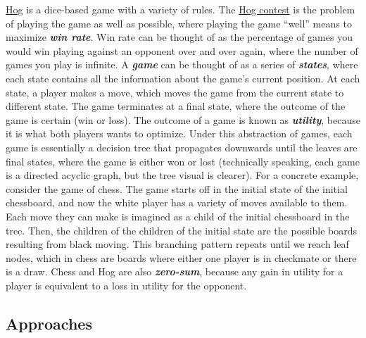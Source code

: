 \documentclass[11pt, oneside]{article}
\newcommand{\emphasis}[1]{\textbf{\textit{#1}}}
\begin{document}
\href{https://cs61a.org/proj/hog/}{Hog} is a dice-based game with a variety of rules.
The \href{https://cs61a.org/proj/hog_contest/}{Hog contest} is the problem
of playing the game as well as possible, where playing the game ``well''
means to maximize \emphasis{win rate}. Win rate can be thought of 
as the percentage of games you would win playing against an opponent 
over and over again, where the number of games you play is infinite.
A \emphasis{game} can be thought of as a series of \emphasis{states},
where each state contains all the information about the game's current position.
At each state, a player makes a move, which moves the game from the current state
to different state. The game terminates at a final state,
where the outcome of the game is certain (win or loss).
The outcome of a game is known as \emphasis{utility}, because
it is what both players wants to optimize.
Under this abstraction of games, each game is essentially a decision tree
that propagates downwards until the leaves are final states, where 
the game is either won or lost (technically speaking, each game is a 
directed acyclic graph, but the tree visual is clearer).
For a concrete example, consider the game of chess.
The game starts off in the initial state of the initial chessboard,
and now the white player has a variety of moves available to them.
Each move they can make is imagined as a child of the initial chessboard
in the tree. Then, the children of the children of the initial state 
are the possible boards resulting from black moving. This branching pattern
repeats until we reach leaf nodes, which in chess are boards where either
one player is in checkmate or there is a draw.
Chess and Hog are also \emphasis{zero-sum}, because any gain in utility 
for a player is equivalent to a loss in utility for the opponent.

\subsection{Approaches}
\end{document}
